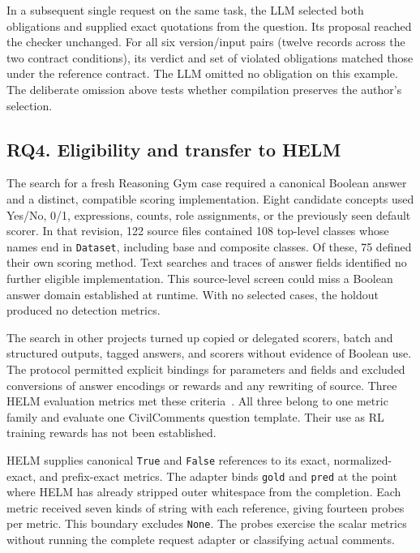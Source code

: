 \documentclass[sigconf]{acmart}
\begin{document}
In a subsequent single request on the same task, the LLM selected both obligations and supplied exact quotations from the question. Its proposal reached the checker unchanged. For all six version/input pairs (twelve records across the two contract conditions), its verdict and set of violated obligations matched those under the reference contract. The LLM omitted no obligation on this example. The deliberate omission above tests whether compilation preserves the author's selection.

\subsection{RQ4. Eligibility and transfer to HELM}

The search for a fresh Reasoning Gym case required a canonical Boolean answer and a distinct, compatible scoring implementation. Eight candidate concepts used Yes/No, 0/1, expressions, counts, role assignments, or the previously seen default scorer. In that revision, 122 source files contained 108 top-level classes whose names end in \texttt{Dataset}, including base and composite classes. Of these, 75 defined their own scoring method. Text searches and traces of answer fields identified no further eligible implementation. This source-level screen could miss a Boolean answer domain established at runtime. With no selected cases, the holdout produced no detection metrics.

The search in other projects turned up copied or delegated scorers, batch and structured outputs, tagged answers, and scorers without evidence of Boolean use. The protocol permitted explicit bindings for parameters and fields and excluded conversions of answer encodings or rewards and any rewriting of source. Three HELM evaluation metrics met these criteria~\cite{helm,helmsource}. All three belong to one metric family and evaluate one CivilComments question template. Their use as RL training rewards has not been established.

HELM supplies canonical \texttt{True} and \texttt{False} references to its exact, normalized-exact, and prefix-exact metrics. The adapter binds \texttt{gold} and \texttt{pred} at the point where HELM has already stripped outer whitespace from the completion. Each metric received seven kinds of string with each reference, giving fourteen probes per metric. This boundary excludes \texttt{None}. The probes exercise the scalar metrics without running the complete request adapter or classifying actual comments.
\end{document}
